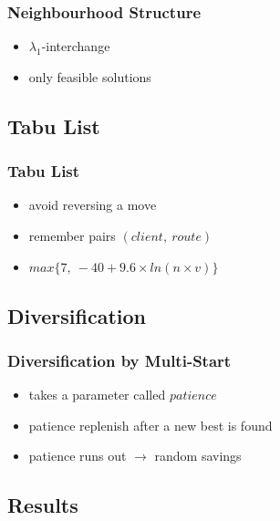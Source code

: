 \documentclass{beamer}
\begin{document}
\begin{frame}
\frametitle{Neighbourhood Structure}
\begin{itemize}
	\item $\lambda_1$-interchange
	\item only feasible solutions
\end{itemize}
\end{frame}


\subsection{Tabu List}

\begin{frame}
\frametitle{Tabu List}
\begin{itemize}
	\item avoid reversing a move
	\item remember pairs $(client,\ route)$
	\item $max\{7,\ -40 + 9.6 \times ln(n \times v)\}$
\end{itemize}
\end{frame}


\subsection{Diversification}

\begin{frame}
\frametitle{Diversification by Multi-Start}
\begin{itemize}
	\item takes a parameter called $patience$
	\item patience replenish after a new best is found
	\item patience runs out $\rightarrow$ random savings
\end{itemize}
\end{frame}

\subsection{Results}
\end{document}

